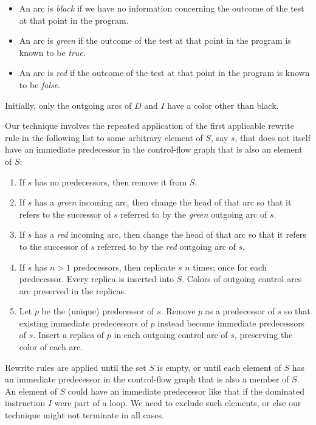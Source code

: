 \begin{itemize}
\item An arc is \emph{black} if we have no information concerning the
  outcome of the test at that point in the program.
\item An arc is \emph{green} if the outcome of the test at that point in
  the program is known to be \emph{true}.
\item An arc is \emph{red} if the outcome of the test at that point in
  the program is known to be \emph{false}.
\end{itemize}

Initially, only the outgoing arcs of $D$ and $I$ have a color
other than black.

Our technique involves the repeated application of the first
applicable rewrite rule in the following list to some arbitrary
element of $S$, say $s$, that does not itself have an immediate
predecessor in the control-flow graph that is also an element of $S$:

\begin{enumerate}
\item If $s$ has no predecessors, then remove it from $S$.
\item If $s$ has a \emph{green} incoming arc, then change the head
  of that arc so that it refers to the successor of $s$ referred to
  by the \emph{green} outgoing arc of $s$.
\item If $s$ has a \emph{red} incoming arc, then change the head
  of that arc so that it refers to the successor of $s$ referred to
  by the \emph{red} outgoing arc of $s$.
\item If $s$ has $n>1$ predecessors, then replicate $s$ $n$ times;
  once for each predecessor.  Every replica is inserted into $S$.
  Colors of outgoing control arcs are preserved in the replicas.
\item Let $p$ be the (unique) predecessor of $s$.  Remove $p$ as a
  predecessor of $s$ so that existing immediate predecessors of $p$
  instead become immediate predecessors of $s$.  Insert a replica of
  $p$ in each outgoing control arc of $s$, preserving the color of
  each arc.
\end{enumerate}

\noindent
Rewrite rules are applied until the set $S$ is empty, or until each
element of $S$ has an immediate predecessor in the control-flow graph
that is also a member of $S$.  An element of $S$ could have an
immediate predecessor like that if the dominated instruction $I$ were
part of a loop.  We need to exclude such elements, or else our
technique might not terminate in all cases.

